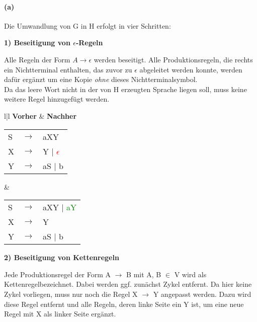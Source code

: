 
\paragraph{(a)}
	Die Umwandlung von G in H erfolgt in vier Schritten:
 
	\textbf{1) Beseitigung von $\epsilon$-Regeln}

	Alle Regeln der Form $A \rightarrow \epsilon$ werden beseitigt. Alle Produktionsregeln, die rechts ein Nichtterminal enthalten, das zuvor zu $\epsilon$ abgeleitet werden konnte, werden dafür ergänzt um eine Kopie \textit{ohne} dieses Nichtterminalsymbol.\\
	Da das leere Wort nicht in der von H erzeugten Sprache liegen soll, muss keine weitere Regel hinzugefügt werden.

	\begin{tabular}{l|l}
		\textbf{Vorher} & \textbf{Nachher} \\
		\hline
		\begin{tabular}{lcl}
		S & $\rightarrow$ & aXY            \\
		X & $\rightarrow$ & Y $\mid$ \textcolor{red}{$\epsilon$} \\ 
		Y & $\rightarrow$ & aS $\mid$ b         \\ 
		\end{tabular} &
		\begin{tabular}{lcl}
		S  & $\rightarrow$ & aXY $\mid$ \textcolor{green}{aY}          \\
		X  & $\rightarrow$ & Y \\ 
		Y  & $\rightarrow$ & aS $\mid$ b         \\ 
		\end{tabular}
	\end{tabular}
	
	\textbf{2) Beseitigung von Kettenregeln}
	
	Jede Produktionsregel der Form A $\rightarrow$ B mit A, B $\in$ V wird als \glqq Kettenregel\grqq bezeichnet.
	Dabei werden ggf. zunächst Zykel entfernt. Da hier keine Zykel vorliegen, muss nur noch die Regel X $\rightarrow$ Y angepasst werden. Dazu wird diese Regel entfernt und alle Regeln, deren linke Seite ein Y ist, um eine neue Regel mit X als linker Seite ergänzt.
	
